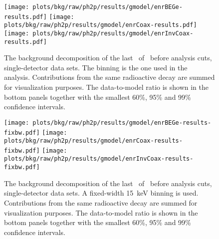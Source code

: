 \begin{sidewaystable}
  \centering
  \footnotesize
  \caption{%
    Summary of the analysis parameter estimates. Global mode and marginalized mode, along
    with its smallest 68\% C.I., are reported as representatives of the posterior
    parameter distribution. The number of reconstructed counts in the fit range and the
    background index at \qbb\ prior active background suppression are listed for each
    component and each analysis data set. The original type of prior distribution is
    marked with \m{[f]} for flat, \m{[g]} for Gaussian and \m{[e]} for exponential.
  }\label{tab:bkg:raw:ph2p:gmodel:results}
\end{sidewaystable}

\begin{figure}
  \centering
  \texttt{[image: plots/bkg/raw/ph2p/results/gmodel/enrBEGe-results.pdf]}
  \texttt{[image: plots/bkg/raw/ph2p/results/gmodel/enrCoax-results.pdf]}
  \texttt{[image: plots/bkg/raw/ph2p/results/gmodel/enrInvCoax-results.pdf]}
  \caption{%
    The background decomposition of the last \gexpophasetwopbkg\ of \gerdatwo\ before
    analysis cuts, single-detector data sets. The binning is the one used in the analysis.
    Contributions from the same radioactive decay are summed for visualization purposes.
    The data-to-model ratio is shown in the bottom panels together with the smallest 60\%,
    95\% and 99\% confidence intervals.
  }\label{fig:bkg:raw:ph2p:results-1}
\end{figure}

\begin{figure}
  \centering
  \texttt{[image: plots/bkg/raw/ph2p/results/gmodel/enrBEGe-results-fixbw.pdf]}
  \texttt{[image: plots/bkg/raw/ph2p/results/gmodel/enrCoax-results-fixbw.pdf]}
  \texttt{[image: plots/bkg/raw/ph2p/results/gmodel/enrInvCoax-results-fixbw.pdf]}
  \caption{%
    The background decomposition of the last \gexpophasetwopbkg\ of \gerdatwo\ before
    analysis cuts, single-detector data sets. A fixed-width 15~keV binning is used.
    Contributions from the same radioactive decay are summed for visualization purposes.
    The data-to-model ratio is shown in the bottom panels together with the smallest 60\%,
    95\% and 99\% confidence intervals.
  }\label{fig:bkg:raw:ph2p:results-2}
\end{figure}

